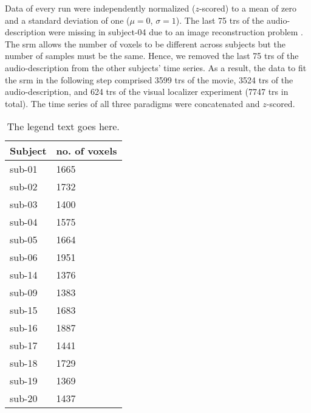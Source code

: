 


Data of every run were independently normalized ($z$-scored) to a mean of zero
and a standard deviation of one ($\mu=0$, $\sigma=1$).
%
The last 75 \acp{tr} of the audio-description were missing in subject-04 due to
an image reconstruction problem \citep[s.][]{hanke2014audiomovie}.
%
The \ac{srm} allows the number of voxels to be different across subjects but the
number of samples must be the same.
%
Hence, we removed the last 75 \acp{tr} of the audio-description from the other
subjects' time series.
As a result, the data to fit the \ac{srm} in the following step comprised 3599
\acp{tr} of the movie, 3524 \acp{tr} of the audio-description, and 624 \acp{tr}
of the visual localizer experiment (7747 \acp{tr} in total).
The time series of all three paradigms were concatenated and $z$-scored.



\begin{table*}[btp]
    \caption{
    \textbf{Table heading.}
    Number of remaining voxels after time series data of each paradigm
    and subject were masked with the union of individual \acp{ppa} that was
    warped from MNI space into each individual's subjects-space and the
    subject-specific field of view of audio-description.}

\label{tab:ppamaskvoxels}
\begin{tabular}{ll}
    \toprule
    \textbf{Subject} & \textbf{no. of voxels} \\
    \midrule
    sub-01 & 1665 \tabularnewline
    sub-02 & 1732 \tabularnewline
    sub-03 & 1400 \tabularnewline
    sub-04 & 1575 \tabularnewline
    sub-05 & 1664 \tabularnewline
    sub-06 & 1951 \tabularnewline
    sub-14 & 1376 \tabularnewline
    sub-09 & 1383 \tabularnewline
    sub-15 & 1683 \tabularnewline
    sub-16 & 1887 \tabularnewline
    sub-17 & 1441 \tabularnewline
    sub-18 & 1729 \tabularnewline
    sub-19 & 1369 \tabularnewline
    sub-20 & 1437 \tabularnewline
    \bottomrule
\end{tabular}
\caption*{The legend text goes here.}
\end{table*}


